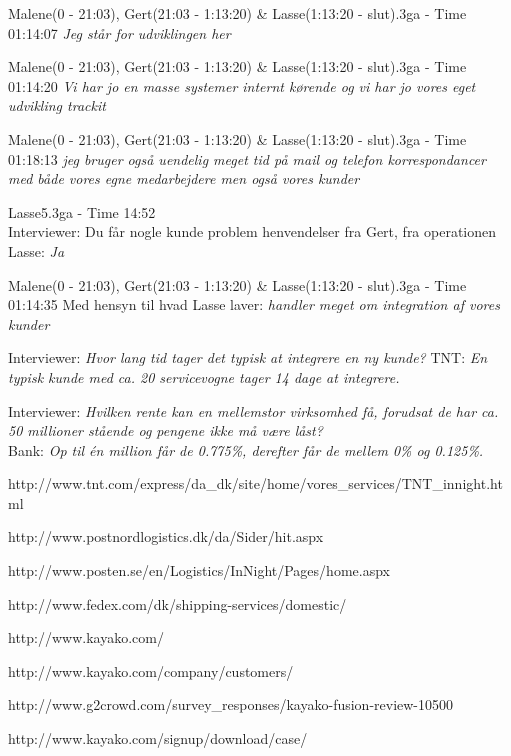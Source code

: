 \begin{thebibliography}{9}
	Malene(0 - 21:03), Gert(21:03 - 1:13:20) \& Lasse(1:13:20 - slut).3ga - Time 01:14:07
	\textit{Jeg står for udviklingen her}

	Malene(0 - 21:03), Gert(21:03 - 1:13:20) \& Lasse(1:13:20 - slut).3ga - Time 01:14:20
	\textit{Vi har jo en masse systemer internt kørende og vi har jo vores eget udvikling trackit}

	Malene(0 - 21:03), Gert(21:03 - 1:13:20) \& Lasse(1:13:20 - slut).3ga - Time 01:18:13
	\textit{jeg bruger også uendelig meget tid på mail og telefon korrespondancer med både vores egne medarbejdere men også vores kunder}

	Lasse5.3ga - Time 14:52 \\
	Interviewer: Du får nogle kunde problem henvendelser fra Gert, fra operationen
Lasse: \textit{Ja}

	Malene(0 - 21:03), Gert(21:03 - 1:13:20) \& Lasse(1:13:20 - slut).3ga - Time 01:14:35
	Med hensyn til hvad Lasse laver: \textit{handler meget om integration af vores kunder}

	Interviewer: \textit{Hvor lang tid tager det typisk at integrere en ny kunde?}
	TNT: \textit{En typisk kunde med ca. 20 servicevogne tager 14 dage at integrere.}

	Interviewer: \textit{Hvilken rente kan en mellemstor virksomhed få, forudsat de har ca. 50 millioner stående og pengene ikke må være låst?}\\
	Bank: \textit{Op til én million får de 0.775\%, derefter får de mellem 0\% og 0.125\%.}

	http://www.tnt.com/express/da\_dk/site/home/vores\_services/TNT\_innight.html

	http://www.postnordlogistics.dk/da/Sider/hit.aspx

	http://www.posten.se/en/Logistics/InNight/Pages/home.aspx

	http://www.fedex.com/dk/shipping-services/domestic/

	http://www.kayako.com/

	http://www.kayako.com/company/customers/

	http://www.g2crowd.com/survey\_responses/kayako-fusion-review-10500

	http://www.kayako.com/signup/download/case/


\end{thebibliography}
